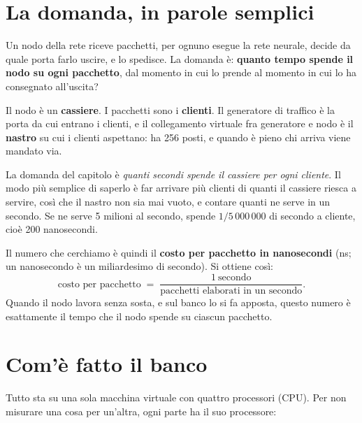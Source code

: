 \documentclass[11pt,a4paper,oneside]{report}
\begin{document}
\section{La domanda, in parole semplici}

Un nodo della rete riceve pacchetti, per ognuno esegue la rete neurale, decide
da quale porta farlo uscire, e lo spedisce. La domanda è: \textbf{quanto tempo
spende il nodo su ogni pacchetto}, dal momento in cui lo prende al momento in
cui lo ha consegnato all'uscita?

\begin{prima}
Il nodo è un \textbf{cassiere}. I pacchetti sono i \textbf{clienti}. Il
generatore di traffico è la porta da cui entrano i clienti, e il collegamento
virtuale fra generatore e nodo è il \textbf{nastro} su cui i clienti aspettano:
ha 256 posti, e quando è pieno chi arriva viene mandato via.

La domanda del capitolo è \emph{quanti secondi spende il cassiere per ogni
cliente}. Il modo più semplice di saperlo è far arrivare più clienti di quanti
il cassiere riesca a servire, così che il nastro non sia mai vuoto, e contare
quanti ne serve in un secondo. Se ne serve 5 milioni al secondo, spende
$1/5\,000\,000$ di secondo a cliente, cioè 200 nanosecondi.
\end{prima}

Il numero che cerchiamo è quindi il \textbf{costo per pacchetto in
nanosecondi} (ns; un nanosecondo è un miliardesimo di secondo). Si ottiene così:
\[
  \text{costo per pacchetto} \;=\; \frac{1\ \text{secondo}}{\text{pacchetti elaborati in un secondo}} .
\]
Quando il nodo lavora senza sosta, e sul banco lo si fa apposta, questo numero
è esattamente il tempo che il nodo spende su ciascun pacchetto.

\section{Com'è fatto il banco}

Tutto sta su una sola macchina virtuale con quattro processori (CPU). Per non
misurare una cosa per un'altra, ogni parte ha il suo processore:
\end{document}

